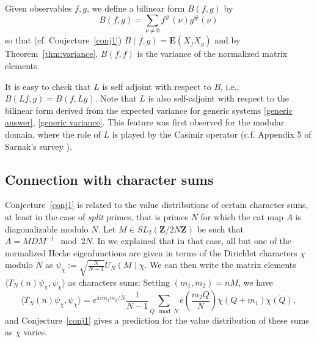 \documentclass[12pt]{amsart}
\theoremstyle{plain}
\newcommand{\Z}{{\mathbf Z}}
\newcommand{\bil}{B}
\newcommand{\diff}{L}
\newcommand{\TN}{T_N}  %
\newcommand{\UN}{U_N}
\newcommand{\rmk}[1]{\footnote{{\bf Comment:} #1}}
\renewcommand{\^}{\widehat}
\newcommand{\fs}{f^\#}
\newcommand{\Ex}{\mathbf E}
\newcommand{\vnn}{\nu}
\begin{document}
Given observables $f,g$, we define a bilinear form $\bil(f,g)$ by
$$
\bil(f,g)
= \sum_{\vnn\neq 0} \fs(\vnn) g^\#(\vnn)
$$
so that (cf. Conjecture~\ref{conj1}) 
$
\bil(f,g) = \Ex(X_f X_g)
$
and by Theorem~\ref{thm:variance},   
$B(f,f)$ is the variance of the normalized matrix elements. 


It is easy to check that $\diff$ is self adjoint with respect to $\bil$, i.e., 
$\bil(\diff f, g) = \bil(f, \diff g)$. 
Note that $\diff$ is also self-adjoint with respect to the bilinear
form derived from the expected variance for generic systems
\eqref{generic answer}, \eqref{generic variance}.  This feature
was first observed for the modular domain, where the role of $\diff$
is played by the Casimir operator \cite{luo-sarnak-matrix-elements}
(c.f. Appendix 5 of Sarnak's survey
\cite{sarnak-spectra-of-hyperbolic-surfaces}). 


\subsection{Connection with character sums} \label{sec:exp sums}
Conjecture~\ref{conj1}  is related to 
the value distributions of certain character sums, at least in 
the case of {\em split} primes, that is primes $N$ for which
the cat map $A$ is diagonalizable modulo $N$. 
%
%
Let $M \in SL_2(\Z/2N\Z)$ be such that 
$A=MDM^{-1}\mod 2N$.  
In \cite{catsup} we explained that in that case, all but
one %
of the normalized Hecke eigenfunctions are
given in terms of the Dirichlet characters $\chi$ modulo $N$ as 
$\psi_\chi:=\sqrt{\frac{N}{N-1}} \UN(M)\chi$.
We can then write the matrix elements 
$\langle\TN(n) \psi_\chi,\psi_\chi\rangle$ as characters sums: Setting 
$(m_1,m_2)=nM$, we have
$$
\langle\TN(n) \psi_\chi,\psi_\chi \rangle = 
e^{\pi i m_1 m_2/N} \frac 1{N-1} \sum_{Q\mod N} e(\frac {m_2 Q}N) 
\chi(Q+m_1)\overline{ \chi(Q)},
$$
%
and Conjecture~\ref{conj1} gives a prediction for the value
distribution of these 
sums as $\chi$ varies. 
\end{document}

